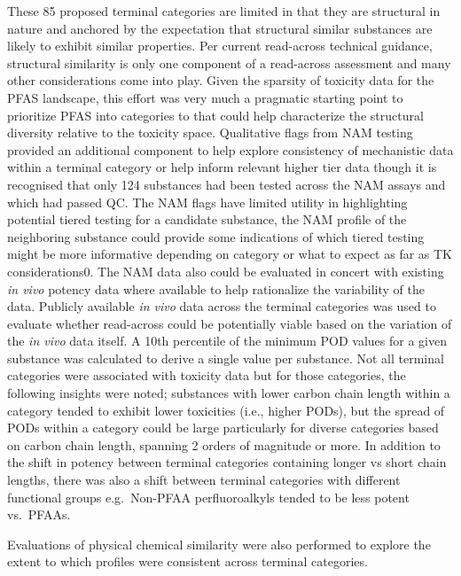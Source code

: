 \documentclass[
  super,
  preprint,
  3p]{elsarticle}
\begin{document}
These 85 proposed terminal categories are limited in that they are
structural in nature and anchored by the expectation that structural
similar substances are likely to exhibit similar properties. Per current
read-across technical guidance, structural similarity is only one
component of a read-across assessment and many other considerations come
into play. Given the sparsity of toxicity data for the PFAS landscape,
this effort was very much a pragmatic starting point to prioritize PFAS
into categories to that could help characterize the structural diversity
relative to the toxicity space. Qualitative flags from NAM testing
provided an additional component to help explore consistency of
mechanistic data within a terminal category or help inform relevant
higher tier data though it is recognised that only 124 substances had
been tested across the NAM assays and which had passed QC. The NAM flags
have limited utility in highlighting potential tiered testing for a
candidate substance, the NAM profile of the neighboring substance could
provide some indications of which tiered testing might be more
informative depending on category or what to expect as far as TK
considerations0. The NAM data also could be evaluated in concert with
existing \emph{in vivo} potency data where available to help rationalize
the variability of the data. Publicly available \emph{in vivo} data
across the terminal categories was used to evaluate whether read-across
could be potentially viable based on the variation of the \emph{in vivo}
data itself. A 10th percentile of the minimum POD values for a given
substance was calculated to derive a single value per substance. Not all
terminal categories were associated with toxicity data but for those
categories, the following insights were noted; substances with lower
carbon chain length within a category tended to exhibit lower toxicities
(i.e., higher PODs), but the spread of PODs within a category could be
large particularly for diverse categories based on carbon chain length,
spanning 2 orders of magnitude or more. In addition to the shift in
potency between terminal categories containing longer vs short chain
lengths, there was also a shift between terminal categories with
different functional groups e.g.~Non-PFAA perfluoroalkyls tended to be
less potent vs.~PFAAs.

Evaluations of physical chemical similarity were also performed to
explore the extent to which profiles were consistent across terminal
categories.
\end{document}
